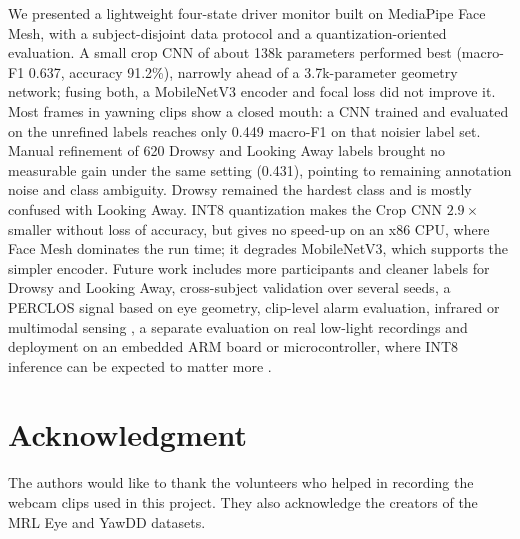 \documentclass[conference]{IEEEtran}
\begin{document}
We presented a lightweight four-state driver monitor built on MediaPipe Face Mesh, with a subject-disjoint data protocol and a quantization-oriented evaluation. A small crop CNN of about 138k parameters performed best (macro-F1 0.637, accuracy 91.2\%), narrowly ahead of a 3.7k-parameter geometry network; fusing both, a MobileNetV3 encoder and focal loss did not improve it. Most frames in yawning clips show a closed mouth: a CNN trained and evaluated on the unrefined labels reaches only 0.449 macro-F1 on that noisier label set. Manual refinement of 620 Drowsy and Looking Away labels brought no measurable gain under the same setting (0.431), pointing to remaining annotation noise and class ambiguity. Drowsy remained the hardest class and is mostly confused with Looking Away. INT8 quantization makes the Crop CNN $2.9\times$ smaller without loss of accuracy, but gives no speed-up on an x86 CPU, where Face Mesh dominates the run time; it degrades MobileNetV3, which supports the simpler encoder. Future work includes more participants and cleaner labels for Drowsy and Looking Away, cross-subject validation over several seeds, a PERCLOS signal based on eye geometry, clip-level alarm evaluation, infrared or multimodal sensing \cite{kim2023,knapik2024,dontoh2025}, a separate evaluation on real low-light recordings and deployment on an embedded ARM board or microcontroller, where INT8 inference can be expected to matter more \cite{alajlan2023,ramp2026}.



\vspace{0.2cm}
\section*{Acknowledgment}

The authors would like to thank the volunteers who helped in recording the webcam clips used in this project. They also acknowledge the creators of the MRL Eye and YawDD datasets.
\end{document}
